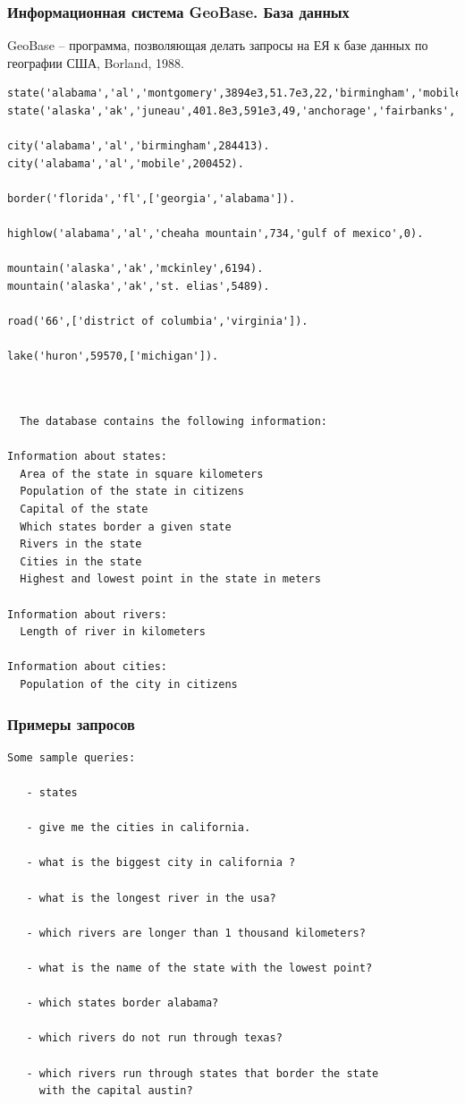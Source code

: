 \documentclass[10pt]{beamer}
\newcommand{\ltprgsize}{\fontsize{5}{5}\selectfont}
\begin{document}
\begin{frame}
  \frametitle{Информационная система GeoBase. База данных}
  GeoBase -- программа, позволяющая делать запросы на ЕЯ к базе данных по географии США, Borland, 1988.
\begin{verbatim}
state('alabama','al','montgomery',3894e3,51.7e3,22,'birmingham','mobile','montgomery','huntsville').
state('alaska','ak','juneau',401.8e3,591e3,49,'anchorage','fairbanks','juneau','sitka').

city('alabama','al','birmingham',284413).
city('alabama','al','mobile',200452).

border('florida','fl',['georgia','alabama']).

highlow('alabama','al','cheaha mountain',734,'gulf of mexico',0).

mountain('alaska','ak','mckinley',6194).
mountain('alaska','ak','st. elias',5489).

road('66',['district of columbia','virginia']).

lake('huron',59570,['michigan']).
\end{verbatim}
  {\ttfamily\ltprgsize
\begin{verbatim}


  The database contains the following information:

Information about states:
  Area of the state in square kilometers
  Population of the state in citizens
  Capital of the state
  Which states border a given state
  Rivers in the state
  Cities in the state
  Highest and lowest point in the state in meters

Information about rivers:
  Length of river in kilometers

Information about cities:
  Population of the city in citizens
\end{verbatim}}
\end{frame}

\begin{frame}[fragile]
   \frametitle{Примеры запросов}
{\ttfamily\footnotesize
\begin{verbatim}
Some sample queries:

   - states

   - give me the cities in california.

   - what is the biggest city in california ?

   - what is the longest river in the usa?

   - which rivers are longer than 1 thousand kilometers?

   - what is the name of the state with the lowest point?

   - which states border alabama?

   - which rivers do not run through texas?

   - which rivers run through states that border the state
     with the capital austin?
\end{verbatim}}
\end{frame}
\end{document}
